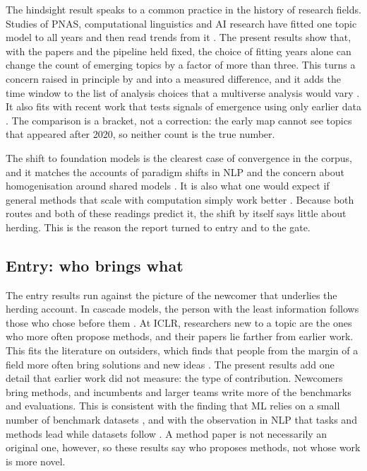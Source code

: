 The hindsight result speaks to a common practice in the history of research fields. Studies of PNAS, computational
linguistics and AI research have fitted one topic model to all years and then read trends from it
\citep{griffiths2004finding,hall2008studying,anderson2012towards,klinger2020narrowing}. The present results show that,
with the papers and the pipeline held fixed, the choice of fitting years alone can change the count of emerging topics
by a factor of more than three. This turns a concern raised in principle by \citet{leydesdorff2002dynamic} and
\citet{rotolo2015what} into a measured difference, and it adds the time window to the list of analysis choices that a
multiverse analysis would vary \citep{steegen2016increasing}. It also fits with recent work that tests signals of
emergence using only earlier data \citep{khanbayov2026topical}. The comparison is a bracket, not a correction: the
early map cannot see topics that appeared after 2020, so neither count is the true number.

The shift to foundation models is the clearest case of convergence in the corpus, and it matches the accounts of
paradigm shifts in NLP \citep{gururaja2023build,saphra2024first} and the concern about homogenisation around shared
models \citep{bommasani2021opportunities}. It is also what one would expect if general methods that scale with
computation simply work better \citep{sutton2019bitter}. Because both routes and both of these readings predict it,
the shift by itself says little about herding. This is the reason the report turned to entry and to the gate.

\subsection{Entry: who brings what}

The entry results run against the picture of the newcomer that underlies the herding account. In cascade models, the
person with the least information follows those who chose before them \citep{bikhchandani1992theory,banerjee1992simple}.
At ICLR, researchers new to a topic are the ones who more often propose methods, and their papers lie farther from
earlier work. This fits the literature on outsiders, which finds that people from the margin of a field more often
bring solutions and new ideas \citep{jeppesen2010marginality,zeng2021fresh,azoulay2019does}. The present results add
one detail that earlier work did not measure: the type of contribution. Newcomers bring methods, and incumbents and
larger teams write more of the benchmarks and evaluations. This is consistent with the finding that ML relies on a
small number of benchmark datasets \citep{koch2021reduced}, and with the observation in NLP that tasks and methods lead
while datasets follow \citep{pramanick2023diachronic}. A method paper is not necessarily an original one, however, so
these results say who proposes methods, not whose work is more novel.

